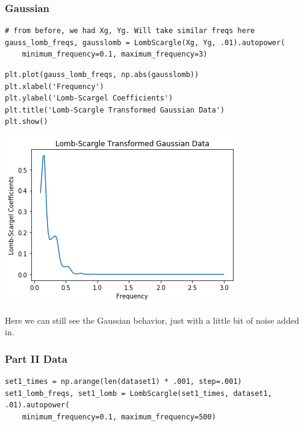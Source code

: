 \documentclass[11pt]{article}
\begin{document}
\subsubsection*{Gaussian}
\label{sec-3-2-1}

\begin{verbatim}
# from before, we had Xg, Yg. Will take similar freqs here
gauss_lomb_freqs, gausslomb = LombScargle(Xg, Yg, .01).autopower(
    minimum_frequency=0.1, maximum_frequency=3)
\end{verbatim}


\begin{verbatim}
plt.plot(gauss_lomb_freqs, np.abs(gausslomb))
plt.xlabel('Frequency')
plt.ylabel('Lomb-Scargel Coefficients')
plt.title('Lomb-Scargle Transformed Gaussian Data')
plt.show()
\end{verbatim}

\includegraphics[width=.9\linewidth]{./obipy-resources/333Grz.png}

Here we can still see the Gaussian behavior, just with a little bit of noise
added in.

\subsubsection*{Part II Data}
\label{sec-3-2-2}

\begin{verbatim}
set1_times = np.arange(len(dataset1) * .001, step=.001)
set1_lomb_freqs, set1_lomb = LombScargle(set1_times, dataset1, .01).autopower(
    minimum_frequency=0.1, maximum_frequency=500)
\end{verbatim}
\end{document}
